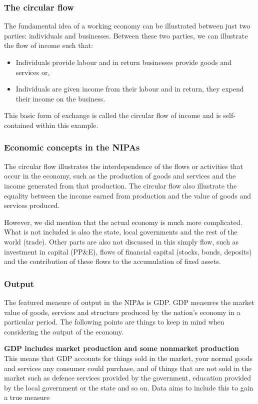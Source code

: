 \documentclass[12pt, letterpaper]{article}
\begin{document}
{\subsubsection{The circular flow}
The fundamental idea of a working economy can be illustrated between just two parties: individuals and businesses. Between these two parties, we can illustrate the flow of income such that:
\begin{itemize}
	\item Individuals provide labour and in return businesses provide goods and services or,
	\item Individuals are given income from their labour and in return, they expend their income on the business.
\end{itemize}
This basic form of exchange is called the circular flow of income and is self-contained within this example.

\subsubsection{Economic concepts in the NIPAs}
The circular flow illustrates the interdependence of the flows or activities that occur in the economy, such as the production of goods and services and the income generated from that production. The circular flow also illustrate the equality between the income earned from production and the value of goods and services produced.

\vspace{10pt}
\noindent However, we did mention that the actual economy is much more complicated. What is not included is also the state, local governments and the rest of the world (trade). Other parts are also not discussed in this simply flow, such as investment in capital (PP\&E), flows of financial capital (stocks, bonds, deposits) and the contribution of these flows to the accumulation of fixed assets.

\subsubsection{Output}
The featured measure of output in the NIPAs is GDP. GDP measures the market value of goods, services and structure produced by the nation's economy in a particular period. The following points are things to keep in mind when considering the output of the economy.

\vspace{10pt}
\noindent\textbf{GDP includes market production and some nonmarket production}\\
This means that GDP accounts for things sold in the market, your normal goods and services any consumer could purchase, and of things that are not sold in the market such as defence services provided by the government, education provided by the local government or the state and so on. Data aims to include this to gain a true measure

}
\end{document}
